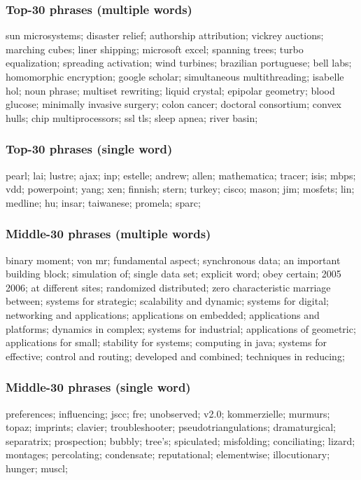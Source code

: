 \documentclass[11pt]{article}
\begin{document}
\subsubsection*{Top-30 phrases (multiple words)}
sun microsystems;
disaster relief;
authorship attribution;
vickrey auctions;
marching cubes;
liner shipping;
microsoft excel;
spanning trees;
turbo equalization;
spreading activation;
wind turbines;
brazilian portuguese;
bell labs;
homomorphic encryption;
google scholar;
simultaneous multithreading;
isabelle hol;
noun phrase;
multiset rewriting;
liquid crystal;
epipolar geometry;
blood glucose;
minimally invasive surgery;
colon cancer;
doctoral consortium;
convex hulls;
chip multiprocessors;
ssl tls;
sleep apnea;
river basin;

\subsubsection*{Top-30 phrases (single word)}
pearl;
lai;
lustre;
ajax;
inp;
estelle;
andrew;
allen;
mathematica;
tracer;
isis;
mbps;
vdd;
powerpoint;
yang;
xen;
finnish;
stern;
turkey;
cisco;
mason;
jim;
mosfets;
lin;
medline;
hu;
insar;
taiwanese;
promela;
sparc;

\subsubsection*{Middle-30 phrases (multiple words)}
binary moment;
von mr;
fundamental aspect;
synchronous data;
an important building block;
simulation of;
single data set;
explicit word;
obey certain;
2005 2006;
at different sites;
randomized distributed;
zero characteristic
marriage between;
systems for strategic;
scalability and dynamic;
systems for digital;
networking and applications;
applications on embedded;
applications and platforms;
dynamics in complex;
systems for industrial;
applications of geometric;
applications for small;
stability for systems;
computing in java;
systems for effective;
control and routing;
developed and combined;
techniques in reducing;

\subsubsection*{Middle-30 phrases (single word)}
preferences;
influencing;
jscc;
fre;
unobserved;
v2.0;
kommerzielle;
murmurs;
topaz;
imprints;
clavier;
troubleshooter;
pseudotriangulations;
dramaturgical;
separatrix;
prospection;
bubbly;
tree's;
spiculated;
misfolding;
conciliating;
lizard;
montages;
percolating;
condensate;
reputational;
elementwise;
illocutionary;
hunger;
muscl;
\end{document}
